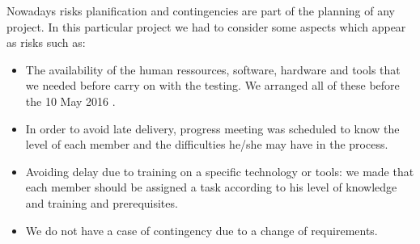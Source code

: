 Nowadays risks planification and contingencies are part of the planning of any project. In this particular project we had to consider some aspects which appear as risks such as: 

\begin{itemize}
 
     \item  The availability of the human ressources, software, hardware and tools that we needed before carry on with the testing. We arranged all of these before the 10 May 2016 . 

      \item In order to avoid late delivery, progress meeting was scheduled to know the level of each member and the difficulties he/she may have in the process.

      \item Avoiding delay due to training on a specific technology or tools: we made that each member should be assigned a task according to his level of knowledge and training and prerequisites.     

       \item We do not have a case of contingency due to a change of requirements. 

\end{itemize}                        